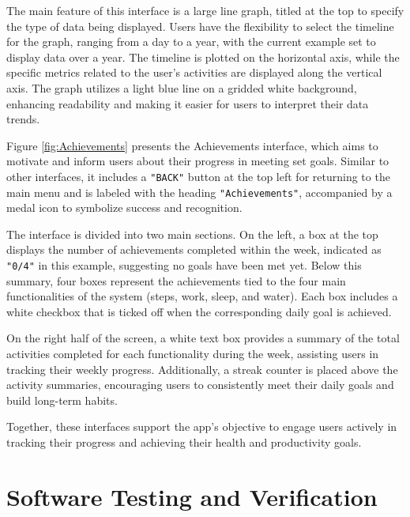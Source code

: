 \documentclass[12pt]{article}
\begin{document}
The main feature of this interface is a large line graph, titled at the top to specify
the type of data being displayed. Users have the flexibility to select the timeline 
for the graph, ranging from a day to a year, with the current example set to display
data over a year. The timeline is plotted on the horizontal axis, while the specific
metrics related to the user’s activities are displayed along the vertical axis. The 
graph utilizes a light blue line on a gridded white background, enhancing readability
and making it easier for users to interpret their data trends.\par

Figure \ref{fig:Achievements} presents the Achievements interface, which aims to motivate
and inform users about their progress in meeting set goals. Similar to other interfaces,
it includes a \texttt{"BACK"} button at the top left for returning to the main menu and is labeled
with the heading \texttt{"Achievements"}, accompanied by a medal icon to symbolize success and recognition.\par

The interface is divided into two main sections. On the left, a box at the top displays
the number of achievements completed within the week, indicated as \texttt{"0/4"} in this example,
suggesting no goals have been met yet. Below this summary, four boxes represent the 
achievements tied to the four main functionalities of the system (steps, work, sleep, and
water). Each box includes a white checkbox that is ticked off when the corresponding daily
goal is achieved.\par

On the right half of the screen, a white text box provides a summary of the total activities
completed for each functionality during the week, assisting users in tracking their weekly
progress. Additionally, a streak counter is placed above the activity summaries, encouraging
users to consistently meet their daily goals and build long-term habits.\par

Together, these interfaces support the app’s objective to engage users actively in tracking
their progress and achieving their health and productivity goals.\par


\section{Software Testing and Verification} \label{sec:testing}
\end{document}
